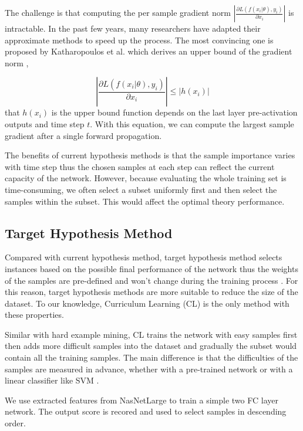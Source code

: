 The challenge is that computing the per sample gradient norm $|\frac{\partial{L(f(x_i|\theta), y_i)}}{\partial{x_i}}|$ is intractable. In the past few years, many researchers have adapted their approximate methods to speed up the process. The most convincing one is proposed by Katharopoulos et al. which derives an upper bound of the gradient norm \cite{Katharopoulos2018},

\begin{equation}
	|\frac{\partial{L(f(x_i|\theta), y_i)}}{\partial{x_i}}|  \leq |h(x_i)|\end{equation}
that $h(x_i)$ is the upper bound function depends on the last layer pre-activation outputs and time step $t$. With this equation, we can compute the largest sample gradient after a single forward propagation.

The benefits of current hypothesis methods is that the sample importance varies with time step thus the chosen samples at each step can reflect the current capacity of the network. However, because evaluating the whole training set is time-consuming, we often select a subset uniformly first and then select the samples within the subset. This would affect the optimal theory performance. 

\subsection{Target Hypothesis Method}
Compared with current hypothesis method, target hypothesis method selects instances based on the possible final performance of the network thus the weights of the samples are pre-defined and won't change during the training process \cite{Bengio2009}. For this reason, target hypothesis methods are more suitable to reduce the size of the dataset. To our knowledge, Curriculum Learning (CL) is the only method with these properties.

Similar with hard example mining, CL trains the network with easy samples first then adds more difficult samples into the dataset and gradually the subset would contain all the training samples. The main difference is that the difficulties of the samples are measured in advance, whether with a pre-trained network or with a linear classifier like SVM \cite{Hacohen2019a}. 

We use extracted features from NasNetLarge to train a simple two FC layer network. The output score is recored and used to select samples in descending order.  


